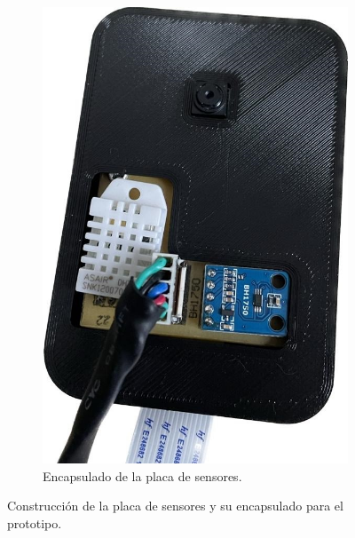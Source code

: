 \begin{figure}[H]
\begin{subfigure}{0.25\textwidth}
        \includegraphics[width=\linewidth]{ImagenesConstruccion del prototipo/sensores_encapsulado_prototipo_alt}
        \caption{Encapsulado de la placa de sensores.}
		\label{fig:sensores_encapsulado_prototipo_alt}
	\end{subfigure}
	\caption{Construcción de la placa de sensores y su encapsulado para el prototipo.}
	\label{fig:sensores_prototipado}
\end{figure}

